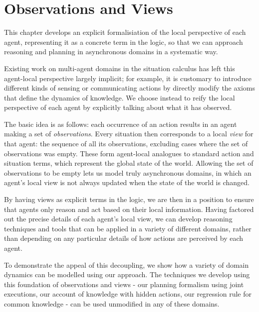 

\chapter{Observations and Views}

\label{ch:observations}

This chapter develops an explicit formalisiation of the local perspective
of each agent, representing it as a concrete term in the logic, so
that we can approach reasoning and planning in asynchronous domains
in a systematic way.

Existing work on multi-agent domains in the situation calculus has
left this agent-local perspective largely implicit; for example, it
is customary to introduce different kinds of sensing or communicating
actions by directly modify the axioms that define the dynamics of
knowledge. We choose instead to reify the local perspective of each
agent by explicitly talking about what it has observed.

The basic idea is as follows: each occurrence of an action results
in an agent making a set of \emph{observations}. Every situation then
corresponds to a local \emph{view} for that agent: the sequence of
all its observations, excluding cases where the set of observations
was empty. These form agent-local analogues to standard action and
situation terms, which represent the global state of the world. Allowing
the set of observations to be empty lets us model truly asynchronous
domains, in which an agent's local view is not always updated when
the state of the world is changed.

By having views as explicit terms in the logic, we are then in a position
to ensure that agents only reason and act based on their local information.
Having factored out the precise details of each agent's local view,
we can develop reasoning techniques and tools that can be applied
in a variety of different domains, rather than depending on any particular
details of how actions are perceived by each agent.

To demonstrate the appeal of this decoupling, we show how a variety
of domain dynamics can be modelled using our approach. The techniques
we develop using this foundation of observations and views - our planning
formalism using joint executions, our account of knowledge with hidden
actions, our regression rule for common knowledge - can be used unmodified
in any of these domains.

